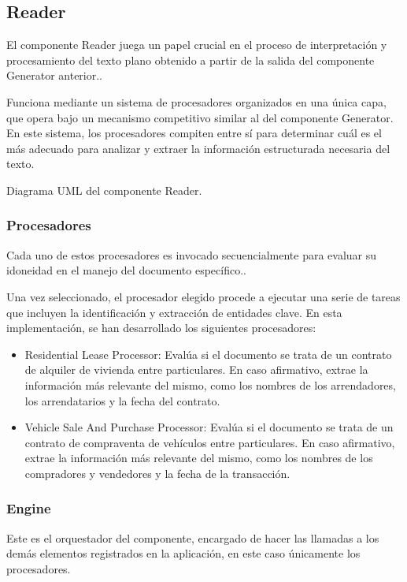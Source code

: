 \subsection*{Reader}
El componente Reader juega un papel crucial en el proceso de interpretación y procesamiento del texto plano obtenido a
partir de la salida del componente Generator anterior..

Funciona mediante un sistema de procesadores organizados en una única capa, que opera bajo un mecanismo competitivo
similar al del componente Generator. En este sistema, los procesadores compiten entre sí para determinar cuál es el más
adecuado para analizar y extraer la información estructurada necesaria del texto.

Diagrama UML del componente Reader.

\subsubsection*{Procesadores}
Cada uno de estos procesadores es invocado secuencialmente para evaluar su idoneidad en el manejo del documento
específico..

Una vez seleccionado, el procesador elegido procede a ejecutar una serie de tareas que incluyen la identificación y
extracción de entidades clave. En esta implementación, se han desarrollado los siguientes procesadores:

\begin{itemize}
    \item Residential Lease Processor: Evalúa si el documento se trata de un contrato de alquiler de vivienda entre
    particulares. En caso afirmativo, extrae la información más relevante del mismo, como los nombres de los
    arrendadores, los arrendatarios y la fecha del contrato.
    \item Vehicle Sale And Purchase Processor: Evalúa si el documento se trata de un contrato de compraventa de
    vehículos
    entre particulares. En caso afirmativo, extrae la información más relevante del mismo, como los nombres de los
    compradores y vendedores y la fecha de la transacción.
\end{itemize}

\subsubsection*{Engine}
Este es el orquestador del componente, encargado de hacer las llamadas a los demás elementos registrados en la
aplicación, en este caso únicamente los procesadores.

